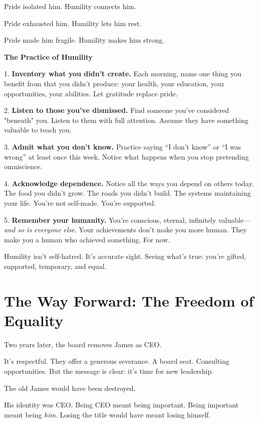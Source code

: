 \documentclass[11pt,twoside]{book}
\begin{document}
Pride isolated him. Humility connects him.

Pride exhausted him. Humility lets him rest.

Pride made him fragile. Humility makes him strong.

\begin{practicebox}
\textbf{The Practice of Humility}

1. \textbf{Inventory what you didn't create.} Each morning, name one thing you benefit from that you didn't produce: your health, your education, your opportunities, your abilities. Let gratitude replace pride.

2. \textbf{Listen to those you've dismissed.} Find someone you've considered "beneath" you. Listen to them with full attention. Assume they have something valuable to teach you.

3. \textbf{Admit what you don't know.} Practice saying ``I don't know'' or ``I was wrong'' at least once this week. Notice what happens when you stop pretending omniscience.

4. \textbf{Acknowledge dependence.} Notice all the ways you depend on others today. The food you didn't grow. The roads you didn't build. The systems maintaining your life. You're not self-made. You're supported.

5. \textbf{Remember your humanity.} You're conscious, eternal, infinitely valuable—\textit{and so is everyone else}. Your achievements don't make you more human. They make you a human who achieved something. For now.

Humility isn't self-hatred. It's accurate sight. Seeing what's true: you're gifted, supported, temporary, and equal.
\end{practicebox}

\section*{The Way Forward: The Freedom of Equality}

Two years later, the board removes James as CEO.

It's respectful. They offer a generous severance. A board seat. Consulting opportunities. But the message is clear: it's time for new leadership.

The old James would have been destroyed.

His identity was CEO. Being CEO meant being important. Being important meant being \emph{him}. Losing the title would have meant losing himself.
\end{document}

